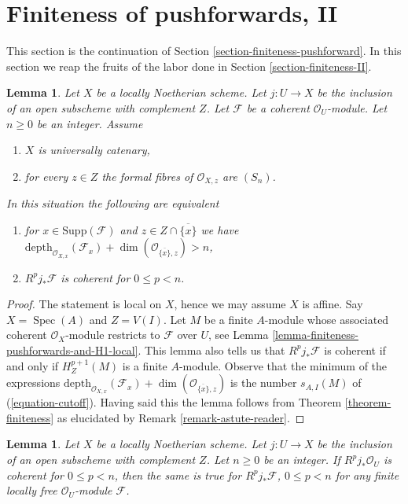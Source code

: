 \documentclass{stacks-project}
\theoremstyle{plain}
\newtheorem{lemma}[subsection]{Lemma}
\theoremstyle{definition}
\theoremstyle{remark}
\numberwithin{equation}{subsection}
\def\Spec{\mathop{\mathrm{Spec}}}
\begin{document}
\section{Finiteness of pushforwards, II}
\label{section-finiteness-pushforward-II}

\noindent
This section is the continuation of
Section \ref{section-finiteness-pushforward}.
In this section we reap the fruits of the labor done in
Section \ref{section-finiteness-II}.

\begin{lemma}
\label{lemma-finiteness-Rjstar}
Let $X$ be a locally Noetherian scheme. Let $j : U \to X$ be the inclusion
of an open subscheme with complement $Z$. Let $\mathcal{F}$ be a coherent
$\mathcal{O}_U$-module. Let $n \geq 0$ be an integer. Assume
\begin{enumerate}
\item $X$ is universally catenary,
\item for every $z \in Z$ the formal fibres of
$\mathcal{O}_{X, z}$ are $(S_n)$.
\end{enumerate}
In this situation the following are equivalent
\begin{enumerate}
\item[(a)] for $x \in \text{Supp}(\mathcal{F})$ and
$z \in Z \cap \overline{\{x\}}$ we have
$\text{depth}_{\mathcal{O}_{X, x}}(\mathcal{F}_x) +
\dim(\mathcal{O}_{\overline{\{x\}}, z}) > n$,
\item[(b)] $R^pj_*\mathcal{F}$ is coherent for $0 \leq p < n$.
\end{enumerate}
\end{lemma}

\begin{proof}
The statement is local on $X$, hence we may assume $X$ is affine.
Say $X = \Spec(A)$ and $Z = V(I)$. Let $M$ be a finite $A$-module
whose associated coherent $\mathcal{O}_X$-module restricts
to $\mathcal{F}$ over $U$, see
Lemma \ref{lemma-finiteness-pushforwards-and-H1-local}.
This lemma also tells us that $R^pj_*\mathcal{F}$ is coherent
if and only if $H^{p + 1}_Z(M)$ is a finite $A$-module.
Observe that the minimum of the expressions
$\text{depth}_{\mathcal{O}_{X, x}}(\mathcal{F}_x) +
\dim(\mathcal{O}_{\overline{\{x\}}, z})$
is the number $s_{A, I}(M)$ of (\ref{equation-cutoff}).
Having said this the lemma follows from
Theorem \ref{theorem-finiteness}
as elucidated by Remark \ref{remark-astute-reader}.
\end{proof}

\begin{lemma}
\label{lemma-finiteness-for-finite-locally-free}
Let $X$ be a locally Noetherian scheme. Let $j : U \to X$ be the inclusion
of an open subscheme with complement $Z$. Let $n \geq 0$ be an integer.
If $R^pj_*\mathcal{O}_U$ is coherent for $0 \leq p < n$, then
the same is true for $R^pj_*\mathcal{F}$, $0 \leq p < n$
for any finite locally free $\mathcal{O}_U$-module $\mathcal{F}$.
\end{lemma}
\end{document}
